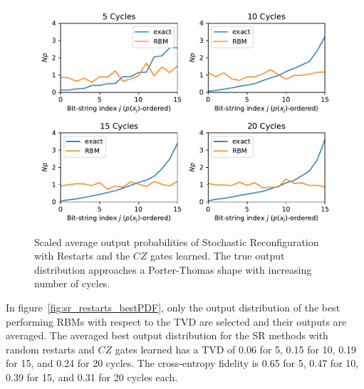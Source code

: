 \begin{figure}[H]
  \centering
  \includegraphics[width=\textwidth]{figures/results/SR-restarts-learned/avgPDF.pdf}
  \caption[Scaled average output probabilities of Stochastic Reconfiguration with Restarts Learned]{
    Scaled average output probabilities of Stochastic Reconfiguration with Restarts and the $CZ$ gates learned. The true 
    output distribution approaches a Porter-Thomas shape with increasing number of cycles.}
  \label{fig:sr_restarts_avgPDF}
\end{figure}

In figure~\ref{fig:sr_restarts_bestPDF}, only the output distribution of the best performing RBMs with respect to the 
TVD are selected and their outputs are averaged. The averaged best output distribution for the SR methods with 
random restarts and $CZ$ gates learned has a TVD of 0.06 for 5, 0.15 for 10, 0.19 for 15, and 0.24 for 20
cycles. The cross-entropy fidelity is 0.65 for 5, 0.47 for 10, 0.39 for 15, and 0.31 for 20 cycles each. 

